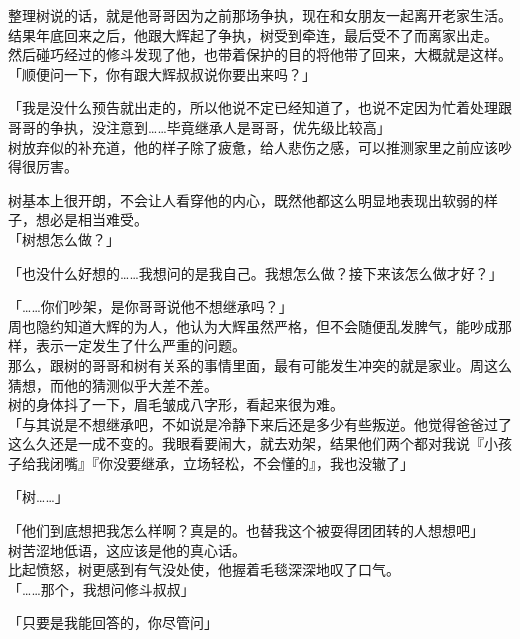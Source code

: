 整理树说的话，就是他哥哥因为之前那场争执，现在和女朋友一起离开老家生活。结果年底回来之后，他跟大辉起了争执，树受到牵连，最后受不了而离家出走。\\

然后碰巧经过的修斗发现了他，也带着保护的目的将他带了回来，大概就是这样。\\

「顺便问一下，你有跟大辉叔叔说你要出来吗？」

「我是没什么预告就出走的，所以他说不定已经知道了，也说不定因为忙着处理跟哥哥的争执，没注意到……毕竟继承人是哥哥，优先级比较高」\\

树放弃似的补充道，他的样子除了疲惫，给人悲伤之感，可以推测家里之前应该吵得很厉害。

树基本上很开朗，不会让人看穿他的内心，既然他都这么明显地表现出软弱的样子，想必是相当难受。\\

「树想怎么做？」

「也没什么好想的……我想问的是我自己。我想怎么做？接下来该怎么做才好？」

「……你们吵架，是你哥哥说他不想继承吗？」\\

周也隐约知道大辉的为人，他认为大辉虽然严格，但不会随便乱发脾气，能吵成那样，表示一定发生了什么严重的问题。\\

那么，跟树的哥哥和树有关系的事情里面，最有可能发生冲突的就是家业。周这么猜想，而他的猜测似乎大差不差。\\

树的身体抖了一下，眉毛皱成八字形，看起来很为难。\\

「与其说是不想继承吧，不如说是冷静下来后还是多少有些叛逆。他觉得爸爸过了这么久还是一成不变的。我眼看要闹大，就去劝架，结果他们两个都对我说『小孩子给我闭嘴』『你没要继承，立场轻松，不会懂的』，我也没辙了」

「树……」

「他们到底想把我怎么样啊？真是的。也替我这个被耍得团团转的人想想吧」\\

树苦涩地低语，这应该是他的真心话。\\

比起愤怒，树更感到有气没处使，他握着毛毯深深地叹了口气。\\

「……那个，我想问修斗叔叔」

「只要是我能回答的，你尽管问」\\

